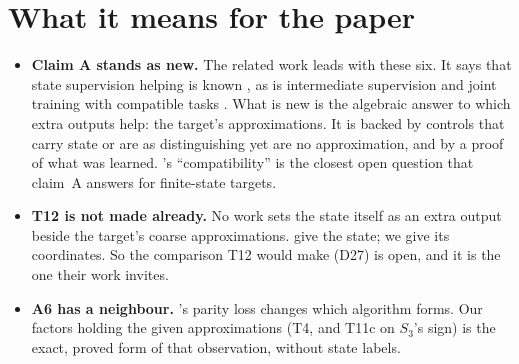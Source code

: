 \documentclass[11pt]{article}
\begin{document}
\section{What it means for the paper}

\begin{itemize}
\item \textbf{Claim A stands as new.} The related work leads with these six. It says that state
  supervision helping is known \citep{dan-2022-robust-generalization-regular-languages}, as is
  intermediate supervision \citep{wies-2023-sub-task-decomposition-sequence-tasks} and joint
  training with compatible tasks \citep{both-2025-joint-task-training-small-models}. What is new is
  the algebraic answer to which extra outputs help: the target's approximations. It is backed by
  controls that carry state or are as distinguishing yet are no approximation, and by a proof of
  what was learned. \citeauthor{both-2025-joint-task-training-small-models}'s ``compatibility'' is
  the closest open question that claim~A answers for finite-state targets.
\item \textbf{T12 is not made already.} No work sets the state itself as an extra output beside
  the target's coarse approximations. \citeauthor{dan-2022-robust-generalization-regular-languages}
  give the state; we give its coordinates. So the comparison T12 would make (D27) is open, and it is
  the one their work invites.
\item \textbf{A6 has a neighbour.} \citeauthor{li-2025-how-language-models-track-state}'s parity
  loss changes which algorithm forms. Our factors holding the given approximations (T4, and T11c on
  $S_3$'s sign) is the exact, proved form of that observation, without state labels.
\end{itemize}



\end{document}
